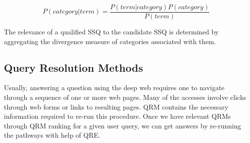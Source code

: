 \begin{equation}
\label{eq:bayesrule}
P (category | term) = \frac{P(term | category) P(category)}{P(term)}
\end{equation}

The relevance of a qualified SSQ to the candidate SSQ is determined by aggregating the divergence measure of categories associated with them. 

\subsection{Query Resolution Methods} 

Usually, answering a question using the 
deep web requires one to navigate through a sequence of one or 
more web pages. Many of the accesses involve clicks through 
web forms or links to resulting pages. QRM contains the necessary  
information required to re-run this procedure. Once we have 
relevant QRMs through QRM ranking for a given user query, we can  
get answers by re-running the pathways with help of QRE. 


  


